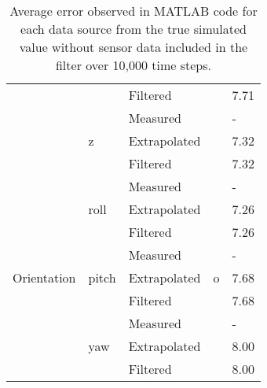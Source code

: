 \begin{table}[ht]
\begin{tabular}{@{}cllcl@{}}
                                              &                        & Filtered     &                           & 7.71          \\
                                              & \multirow{3}{*}{z}     & Measured     &                           & -        \\
                                              &                        & Extrapolated &                           & 7.32          \\
                                              &                        & Filtered     &                           & 7.32          \\ \midrule
\multirow{9}{*}{Orientation}                  & \multirow{3}{*}{roll}  & Measured     & \multirow{9}{*}{o}        & -          \\
                                              &                        & Extrapolated &                           & 7.26          \\
                                              &                        & Filtered     &                           & 7.26          \\
                                              & \multirow{3}{*}{pitch} & Measured     &                           & -          \\
                                              &                        & Extrapolated &                           & 7.68          \\
                                              &                        & Filtered     &                           & 7.68          \\
                                              & \multirow{3}{*}{yaw}   & Measured     &                           & -          \\
                                              &                        & Extrapolated &                           & 8.00          \\
                                              &                        & Filtered     &                           & 8.00          \\ \midrule
\end{tabular}
\caption{Average error observed in MATLAB code for each data source from the true simulated value without sensor data included in the filter over 10,000 time steps.}
\label{tab:rawvaluesnosensor}
\end{table}

